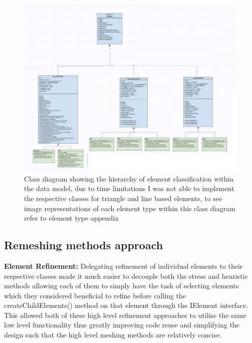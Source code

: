 \begin{figure}[h!!]                                                   
  \centerline{\includegraphics[width=150mm, scale=1]{../Graphics/ElementHigerarchyDiagram2.png}}
  \caption{Class diagram showing the hierarchy of element classification within the data model, due to time limitations I was not able to implement the respective classes for triangle and line based elements, to see image representations of each element type within this class diagram refer to element type appendix}
  \label{fig:h-refinementImp}
\end{figure}


\subsection{Remeshing methods approach}
\textbf{Element Refinement: } Delegating refinement of individual elements to their respective classes made it much easier to decouple both the stress and heuristic methods allowing each of them to simply have the task of selecting elements which they considered beneficial to refine before calling the createChildElements() method on that element through the IElement interface. This allowed both of these high level refinement approaches to utilise the same low level functionality thus greatly improving code reuse and simplifying the design such that the high level meshing methods are relatively concise. \\

